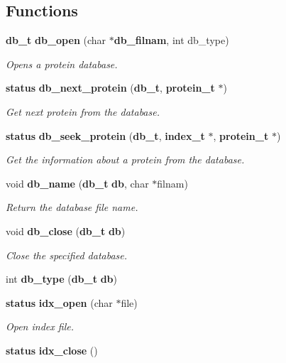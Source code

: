 \subsection*{Functions}
\begin{CompactItemize}
\item 
{\bf db\_\-t} {\bf db\_\-open} (char $\ast${\bf db\_\-filnam}, int db\_\-type)
\begin{CompactList}\small\item\em Opens a protein database.\item\end{CompactList}\item 
{\bf status} {\bf db\_\-next\_\-protein} ({\bf db\_\-t}, {\bf protein\_\-t} $\ast$)
\begin{CompactList}\small\item\em Get next protein from the database.\item\end{CompactList}\item 
{\bf status} {\bf db\_\-seek\_\-protein} ({\bf db\_\-t}, {\bf index\_\-t} $\ast$, {\bf protein\_\-t} $\ast$)
\begin{CompactList}\small\item\em Get the information about a protein from the database.\item\end{CompactList}\item 
void {\bf db\_\-name} ({\bf db\_\-t} {\bf db}, char $\ast$filnam)
\begin{CompactList}\small\item\em Return the database file name.\item\end{CompactList}\item 
void {\bf db\_\-close} ({\bf db\_\-t} {\bf db})
\begin{CompactList}\small\item\em Close the specified database.\item\end{CompactList}\item 
int {\bf db\_\-type} ({\bf db\_\-t} {\bf db})
\item 
{\bf status} {\bf idx\_\-open} (char $\ast$file)
\begin{CompactList}\small\item\em Open index file.\item\end{CompactList}\item 
{\bf status} {\bf idx\_\-close} ()

\end{CompactItemize}
